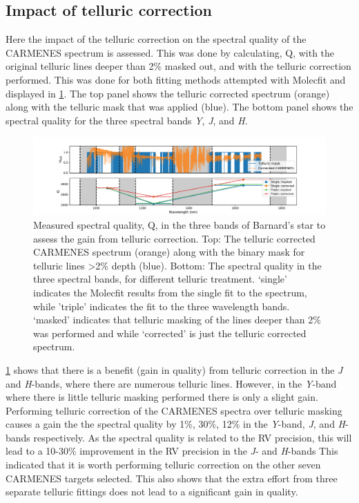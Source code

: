 \subsection{Impact of telluric correction}
\label{Impact_telluric_correction}
Here the impact of the telluric correction on the spectral quality of the CARMENES spectrum is assessed.
This was done by calculating, Q, with the original telluric lines deeper than 2\% masked out, and with the telluric correction performed.
This was done for both fitting methods attempted with Molecfit and displayed in \cref{fig:band_qualityfromapplyingtelluriccorrection}.
The top panel shows the telluric corrected spectrum (orange) along with the telluric mask that was applied (blue).
The bottom panel shows the spectral quality for the three spectral bands \emph{Y}, \emph{J}, and \emph{H}.

\begin{figure}
    \centering
    \includegraphics[width=0.7\linewidth]{figures/information-content/Carmenes/Band_quality_from_applying_telluric_correction}
    \caption[Barnard's star spectral quality.]{Measured spectral quality, Q, in the three \nir{} bands of Barnard's star to assess the gain from telluric correction. 
        Top: The telluric corrected CARMENES spectrum (orange) along with the binary mask for telluric lines >2\% depth (blue). 
        Bottom: The spectral quality in the three spectral bands, for different telluric treatment. `single' indicates the Molecfit results from the single fit to the spectrum, while 'triple' indicates the fit to the three wavelength bands.
        `masked' indicates that telluric masking of the lines deeper than 2\% was performed and while `corrected' is just the telluric corrected spectrum.}
    \label{fig:band_qualityfromapplyingtelluriccorrection}
\end{figure}

\cref{fig:band_qualityfromapplyingtelluriccorrection} shows that there is a benefit (gain in quality) from telluric correction in the \emph{J} and \emph{H}-bands, where there are numerous telluric lines.
However, in the \emph{Y}-band where there is little telluric masking performed there is only a slight gain.
Performing telluric correction of the CARMENES spectra over telluric masking causes a gain the the spectral quality by 1\%, 30\%, 12\% in the \emph{Y}-band, \emph{J}, and \emph{H}-bands respectively.
As the spectral quality is related to the RV precision, this will lead to a 10-30\% improvement in the RV precision in the \emph{J}- and \emph{H}-bands
This indicated that it is worth performing telluric correction on the other seven {CARMENES} targets selected.
This also shows that the extra effort from three separate telluric fittings does not lead to a significant gain in quality.



